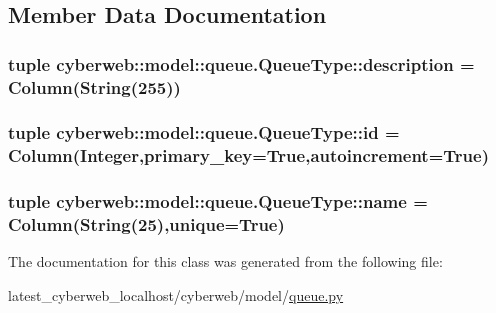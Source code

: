 \subsection{\-Member \-Data \-Documentation}
\hypertarget{classcyberweb_1_1model_1_1queue_1_1_queue_type_a916db2914c1ed0a16f6a050c7b39c11e}{
\subsubsection[{description}]{\setlength{\rightskip}{0pt plus 5cm}tuple {\bf cyberweb\-::model\-::queue.\-Queue\-Type\-::description} = \-Column(\-String(255))}}\label{classcyberweb_1_1model_1_1queue_1_1_queue_type_a916db2914c1ed0a16f6a050c7b39c11e}
\hypertarget{classcyberweb_1_1model_1_1queue_1_1_queue_type_acf3df97b8efef8b230213f6b1db2d842}{
\subsubsection[{id}]{\setlength{\rightskip}{0pt plus 5cm}tuple {\bf cyberweb\-::model\-::queue.\-Queue\-Type\-::id} = \-Column(\-Integer,primary\-\_\-key=\-True,autoincrement=\-True)}}\label{classcyberweb_1_1model_1_1queue_1_1_queue_type_acf3df97b8efef8b230213f6b1db2d842}
\hypertarget{classcyberweb_1_1model_1_1queue_1_1_queue_type_a6fe6ad07d00c7930259e2babca68ff57}{
\subsubsection[{name}]{\setlength{\rightskip}{0pt plus 5cm}tuple {\bf cyberweb\-::model\-::queue.\-Queue\-Type\-::name} = \-Column(\-String(25),unique=\-True)}}\label{classcyberweb_1_1model_1_1queue_1_1_queue_type_a6fe6ad07d00c7930259e2babca68ff57}


\-The documentation for this class was generated from the following file\-:\begin{DoxyCompactItemize}
\item 
latest\-\_\-cyberweb\-\_\-localhost/cyberweb/model/\hyperlink{queue_8py}{queue.\-py}\end{DoxyCompactItemize}
